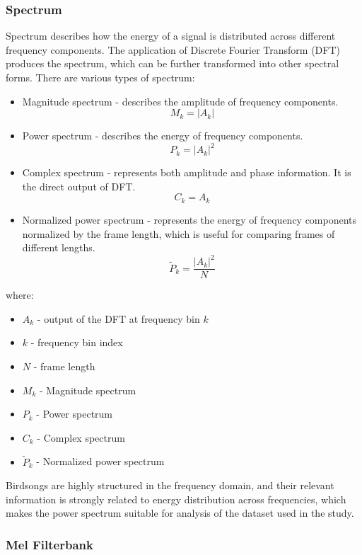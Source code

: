 \documentclass[
onecolumn,
]{ceurart}
\begin{document}
\subsubsection{Spectrum}

Spectrum describes how the energy of a signal is distributed across different frequency components. The application of Discrete Fourier Transform (DFT) produces the spectrum, which can be further transformed into other spectral forms. There are various types of spectrum:
\begin{itemize}
  \item Magnitude spectrum - describes the amplitude of frequency components.
  \[
  M_k = |A_k|
  \]
  \item Power spectrum - describes the energy of frequency components.
  \[
  P_k = |A_k|^2
  \]
  \item Complex spectrum - represents both amplitude and phase information. It is the direct output of DFT.
  \[
  C_k = A_k
  \]
  \item Normalized power spectrum - represents the energy of frequency components normalized by the frame length, which is useful for comparing frames of different lengths.
  \[
  \tilde{P}_k = \frac{|A_k|^2}{N}
  \]
\end{itemize}
where:
\begin{itemize}
  \item $A_k$ - output of the DFT at frequency bin $k$
  \item $k$ - frequency bin index
  \item $N$ - frame length
  \item $M_k$ - Magnitude spectrum
  \item $P_k$ - Power spectrum
  \item $C_k$ - Complex spectrum
  \item $\tilde{P}_k$ - Normalized power spectrum
\end{itemize}
Birdsongs are highly structured in the frequency domain, and their relevant information is strongly related to energy distribution across frequencies, which makes the power spectrum suitable for analysis of the dataset used in the study.

\subsubsection{Mel Filterbank}
\end{document}
